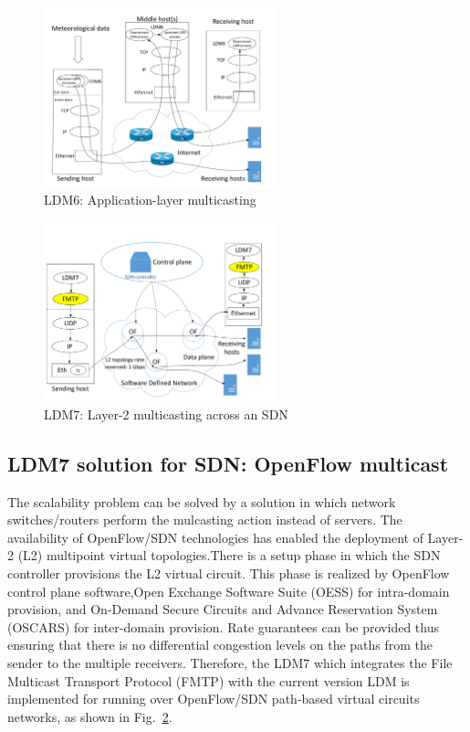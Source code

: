\begin{figure}[htbp!]
\centering
\includegraphics[width=0.60\textwidth]{figures/ALmulticast.pdf}
\caption{LDM6: Application-layer multicasting}
\label{fig:AL-multicast}
\end{figure} 

\begin{figure}[htbp!]
\centering
\includegraphics[width=0.60\textwidth]{figures/SDN.pdf}
\caption{LDM7: Layer-2 multicasting across an SDN}
\label{fig:SDN}
\end{figure} 

\subsection{LDM7 solution for SDN: OpenFlow multicast}
\label{sec:LDM7}
The scalability problem can be solved by a solution in which network switches/routers perform the mulcasting action instead of servers. The availability of OpenFlow/SDN technologies has enabled the deployment of Layer-2 (L2) multipoint virtual topologies.There is a setup phase in which the SDN controller provisions the L2 virtual circuit. This phase is realized by OpenFlow control plane software,Open Exchange Software Suite (OESS) for intra-domain provision, and On-Demand Secure Circuits and Advance Reservation System (OSCARS) for inter-domain provision. Rate guarantees can be provided thus ensuring that there is no differential congestion levels on the paths from the sender to the multiple receivers. Therefore, the LDM7 which integrates the File Multicast Transport Protocol (FMTP) with the current version LDM is implemented for running over OpenFlow/SDN path-based virtual circuits networks, as shown in Fig.~\ref{fig:SDN}.

